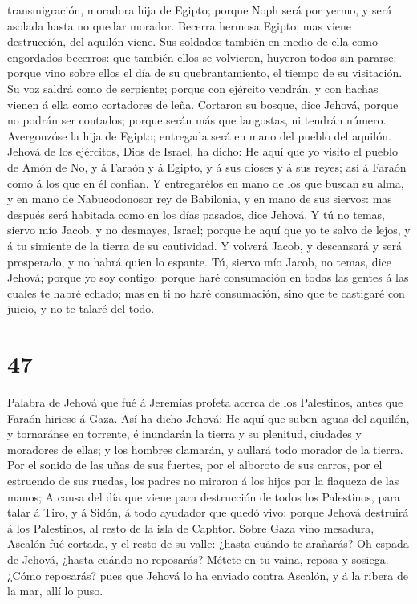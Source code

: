 transmigración, moradora hija de Egipto; porque Noph será por yermo, y
será asolada hasta no quedar morador.  Becerra hermosa
Egipto; mas viene destrucción, del aquilón viene.  Sus
soldados también en medio de ella como engordados becerros: que también
ellos se volvieron, huyeron todos sin pararse: porque vino sobre ellos
el día de su quebrantamiento, el tiempo de su visitación.
 Su voz saldrá como de serpiente; porque con ejército
vendrán, y con hachas vienen á ella como cortadores de leña.
 Cortaron su bosque, dice Jehová, porque no podrán ser
contados; porque serán más que langostas, ni tendrán número.
 Avergonzóse la hija de Egipto; entregada será en mano
del pueblo del aquilón.  Jehová de los ejércitos, Dios de
Israel, ha dicho: He aquí que yo visito el pueblo de Amón de No, y á
Faraón y á Egipto, y á sus dioses y á sus reyes; así á Faraón como á los
que en él confían.  Y entregarélos en mano de los que
buscan su alma, y en mano de Nabucodonosor rey de Babilonia, y en mano
de sus siervos: mas después será habitada como en los días pasados, dice
Jehová.  Y tú no temas, siervo mío Jacob, y no desmayes,
Israel; porque he aquí que yo te salvo de lejos, y á tu simiente de la
tierra de su cautividad. Y volverá Jacob, y descansará y será
prosperado, y no habrá quien lo espante.  Tú, siervo mío
Jacob, no temas, dice Jehová; porque yo soy contigo: porque haré
consumación en todas las gentes á las cuales te habré echado; mas en ti
no haré consumación, sino que te castigaré con juicio, y no te talaré
del todo.

\hypertarget{section-46}{%
\section{47}\label{section-46}}

 Palabra de Jehová que fué á Jeremías profeta acerca de
los Palestinos, antes que Faraón hiriese á Gaza.  Así ha
dicho Jehová: He aquí que suben aguas del aquilón, y tornaránse en
torrente, é inundarán la tierra y su plenitud, ciudades y moradores de
ellas; y los hombres clamarán, y aullará todo morador de la tierra.
 Por el sonido de las uñas de sus fuertes, por el alboroto
de sus carros, por el estruendo de sus ruedas, los padres no miraron á
los hijos por la flaqueza de las manos;  A causa del día
que viene para destrucción de todos los Palestinos, para talar á Tiro, y
á Sidón, á todo ayudador que quedó vivo: porque Jehová destruirá á los
Palestinos, al resto de la isla de Caphtor.  Sobre Gaza
vino mesadura, Ascalón fué cortada, y el resto de su valle: ¿hasta
cuándo te arañarás?  Oh espada de Jehová, ¿hasta cuándo no
reposarás? Métete en tu vaina, reposa y sosiega.  ¿Cómo
reposarás? pues que Jehová lo ha enviado contra Ascalón, y á la ribera
de la mar, allí lo puso.

